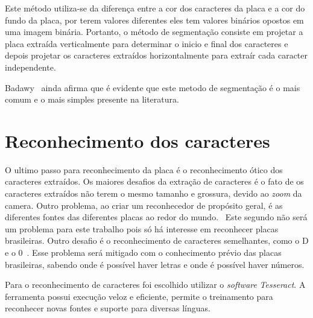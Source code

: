 Este método utiliza-se da diferença entre a cor dos caracteres da placa e a cor
do fundo da placa, por terem valores diferentes eles tem valores binários
opostos em uma imagem binária. Portanto, o método de segmentação consiste em
projetar a placa extraída verticalmente para determinar o inicio e final dos
caracteres e depois projetar os caracteres extraídos horizontalmente para
extraír cada caracter independente.

Badawy~\cite{s2013automatic} ainda afirma que é evidente que este metodo de
segmentação é o mais comum e o mais simples presente na literatura.

\section{Reconhecimento dos caracteres} \label{sec:reconhecimento}

O ultimo passo para reconhecimento da placa é o reconhecimento ótico dos
caracteres extraídos. Os maiores desafios da extração de caracteres é o fato de
os caracteres extraídos não terem o mesmo tamanho e grossura, devido ao
\emph{zoom} da camera. Outro problema, ao criar um reconhecedor de propósito
geral, é as diferentes fontes das diferentes placas ao redor do mundo.~\cite{s2013automatic}
Este segundo não será um problema para este trabalho pois
só há interesse em reconhecer placas brasileiras. Outro desafio é o
reconhecimento de caracteres semelhantes, como o D e o
0~\cite{ho2016intelligent}.  Esse problema será mitigado com o conhecimento
prévio das placas brasileiras, sabendo onde é possível haver letras e onde é
possível haver números.

Para o reconhecimento de caracteres foi escolhido utilizar o \emph{software}
\emph{Tesseract}. A ferramenta possui execução veloz e eficiente, permite o
treinamento para reconhecer novas fontes e suporte para diversas línguas.
